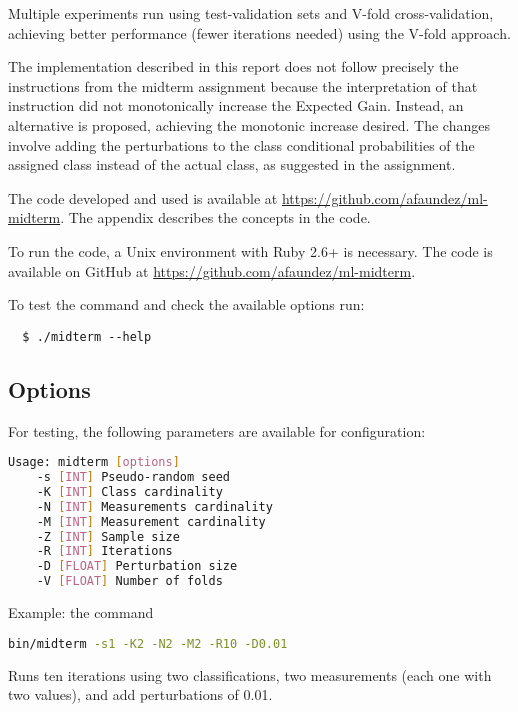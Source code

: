 \documentclass[letterpaper, conference]{IEEEtran}
\begin{document}
Multiple experiments run using test-validation sets and V-fold cross-validation, achieving better performance (fewer iterations needed) using the V-fold approach.

The implementation described in this report does not follow precisely the instructions from the midterm assignment because the interpretation of that instruction did not monotonically increase the Expected Gain. Instead, an alternative is proposed, achieving the monotonic increase desired. The changes involve adding the perturbations to the class conditional probabilities of the assigned class instead of the actual class, as suggested in the assignment.

The code developed and used is available at \url{https://github.com/afaundez/ml-midterm}. The appendix describes the concepts in the code.


\appendix

To run the code, a Unix environment with Ruby 2.6+ is necessary. The code is available on GitHub at \url{https://github.com/afaundez/ml-midterm}.

To test the command and check the available options run:

\begin{verbatim}
  $ ./midterm --help
\end{verbatim}

\subsection{Options}

For testing, the following parameters are available for configuration:

\begin{lstlisting}[language=sh]
  Usage: midterm [options]
    -s [INT] Pseudo-random seed
    -K [INT] Class cardinality
    -N [INT] Measurements cardinality
    -M [INT] Measurement cardinality 
    -Z [INT] Sample size
    -R [INT] Iterations
    -D [FLOAT] Perturbation size
    -V [FLOAT] Number of folds
\end{lstlisting}

Example: the command

\begin{lstlisting}[language=sh]
  bin/midterm -s1 -K2 -N2 -M2 -R10 -D0.01
\end{lstlisting}

Runs ten iterations using two classifications, two measurements (each one with two values), and add perturbations of 0.01.
\end{document}
